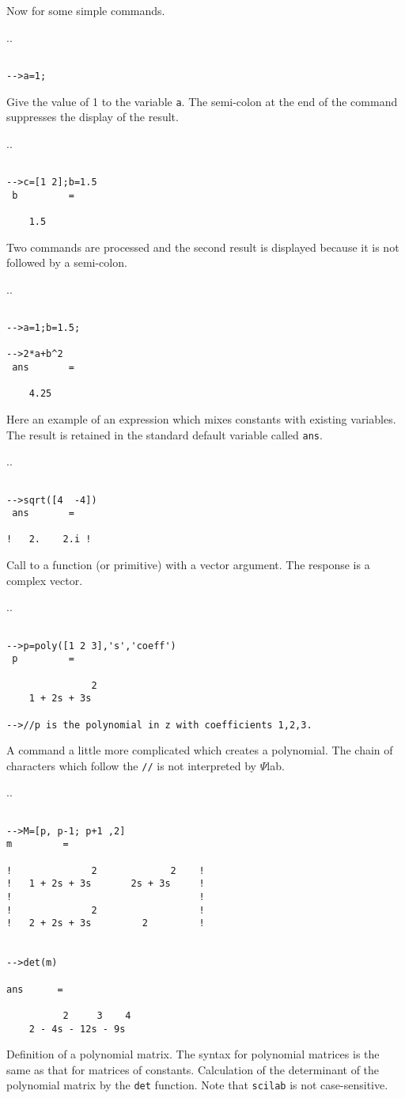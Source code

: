 	Now for some simple commands.

\noindent.\dotfill.
\begin{verbatim}

-->a=1;
\end{verbatim}
Give the value of 1 to the variable {\tt a}.  The semi-colon
at the end of the command suppresses the display of the result.

\noindent.\dotfill.
\begin{verbatim}
 
-->c=[1 2];b=1.5
 b         =
 
    1.5  
\end{verbatim}
Two commands are processed and the second result is displayed because
it is not followed by a semi-colon.

\noindent.\dotfill.
\begin{verbatim}
 
-->a=1;b=1.5;
 
-->2*a+b^2
 ans       =
 
    4.25  
\end{verbatim}
Here an example of an expression which mixes constants with existing
variables.  The result is retained in the standard default variable 
called {\tt ans}.

\noindent.\dotfill.
\begin{verbatim}
 
-->sqrt([4  -4])
 ans       =
 
!   2.    2.i !
\end{verbatim} 
Call to a function (or primitive) with a vector argument.  The response
is a complex vector.

\noindent.\dotfill.
\begin{verbatim}
 
-->p=poly([1 2 3],'s','coeff')
 p         =
 
               2  
    1 + 2s + 3s   
 
-->//p is the polynomial in z with coefficients 1,2,3.
\end{verbatim}
A command a little more complicated which creates a polynomial.  The
chain of characters which follow the {\tt //} is not interpreted by
$\Psi$lab.

\noindent.\dotfill.
\begin{verbatim}

-->M=[p, p-1; p+1 ,2]
m         =
 
!              2             2    !
!   1 + 2s + 3s       2s + 3s     !
!                                 !
!              2                  !
!   2 + 2s + 3s         2         !
 

-->det(m)

ans      =

          2     3    4  
    2 - 4s - 12s - 9s   

\end{verbatim}
Definition of a polynomial matrix. The syntax for polynomial matrices
is the same as that for matrices of constants. Calculation of the
determinant of the polynomial matrix by the {\tt det} function. 
Note that {\tt scilab} is not case-sensitive.

